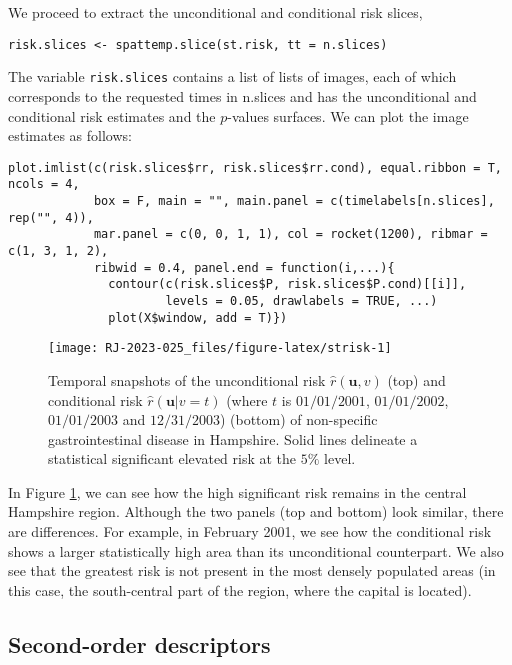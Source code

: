 We proceed to extract the unconditional and conditional risk slices,

\begin{verbatim}
risk.slices <- spattemp.slice(st.risk, tt = n.slices)
\end{verbatim}

The variable \texttt{risk.slices} contains a list of lists of images, each of which corresponds to the requested times in n.slices and has the unconditional and conditional risk estimates and the \(p\)-values surfaces. We can plot the image estimates as follows:

\begin{verbatim}
plot.imlist(c(risk.slices$rr, risk.slices$rr.cond), equal.ribbon = T, ncols = 4, 
            box = F, main = "", main.panel = c(timelabels[n.slices], rep("", 4)), 
            mar.panel = c(0, 0, 1, 1), col = rocket(1200), ribmar = c(1, 3, 1, 2), 
            ribwid = 0.4, panel.end = function(i,...){
              contour(c(risk.slices$P, risk.slices$P.cond)[[i]], 
                      levels = 0.05, drawlabels = TRUE, ...)
              plot(X$window, add = T)})
\end{verbatim}

\begin{figure}

{\centering \texttt{[image: RJ-2023-025\_files/figure-latex/strisk-1]} 

}

\caption{Temporal snapshots of the unconditional risk $\hat{r}(\mathbf{u},v)$ (top) and conditional risk $\hat{r}(\mathbf{u}|v= t)$ (where $t$ is $01/01/2001$, $01/01/2002$, $01/01/2003$ and $12/31/2003$) (bottom) of non-specific gastrointestinal disease in Hampshire. Solid lines delineate a statistical significant elevated risk at the $5\%$ level.}\label{fig:strisk}
\end{figure}

In Figure \ref{fig:strisk}, we can see how the high significant risk remains in the central Hampshire region. Although the two panels (top and bottom) look similar, there are differences. For example, in February 2001, we see how the conditional risk shows a larger statistically high area than its unconditional counterpart. We also see that the greatest risk is not present in the most densely populated areas (in this case, the south-central part of the region, where the capital is located).

\hypertarget{second-order-descriptors-1}{%
\subsection{Second-order descriptors}\label{second-order-descriptors-1}}

